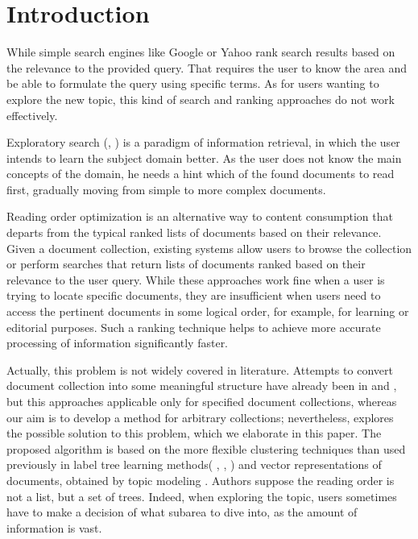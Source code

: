 \documentclass[12pt,twoside]{article}
\title
{Topic Models Selection for Reading Orders Generation over Document Collections}
\author
{Mamonov~K.\,R.,  Vorontsov~K.\,V., Eremeev~M.\,A} %
\begin{document}
	
	\maketitle
	
	\section{Introduction}
    While simple search engines like Google or Yahoo rank search results based on the relevance to the provided query. That requires the user to know the area and be able to formulate the query using specific terms. As for users wanting to explore the new topic, this kind of search and ranking approaches do not work effectively.
    
    Exploratory search (\cite{white09exploratory}, \cite{marchionini06exploratory}) is a paradigm of information retrieval, in which the user intends to learn the subject domain better. As the user does not know the main concepts of the domain, he needs a hint which of the found documents to read first, gradually moving from simple to more complex documents. 
    
    Reading order optimization is an alternative way to content consumption that departs from the typical ranked lists of documents based on their relevance. Given a document collection, existing systems allow users to browse the collection or perform searches that return lists of documents ranked based on their relevance to the user query. While these approaches work fine when a user is trying to locate specific documents, they are insufficient when users need to access the pertinent documents in some logical order, for example, for learning or editorial purposes. Such a ranking technique helps to achieve more accurate processing of information significantly faster. 
    
    Actually, this problem is not widely covered in literature. Attempts to convert document collection into some meaningful structure have already been in \cite{journals/tkdd/ShahafG12} and \cite{conf/cikm/FengA09}, but this approaches applicable only for specified document collections, whereas our aim is to develop a method for arbitrary collections; nevertheless, \cite{conf/icde/KoutrikaLS15} explores the possible solution to this problem, which we elaborate in this paper. The proposed algorithm is based on the more flexible clustering techniques than used previously in label tree learning methods( \cite{conf/nips/BengioWG10}, \cite{conf/icpr/LiuCSTN12}, \cite{conf/webi/LiuT10}) and vector representations of documents, obtained by topic modeling \cite{hofmann1999probabilistic}. Authors suppose the reading order is not a list, but a set of trees. Indeed, when exploring the topic, users sometimes have to make a decision of what subarea to dive into, as the amount of information is vast. 
    
\end{document}
